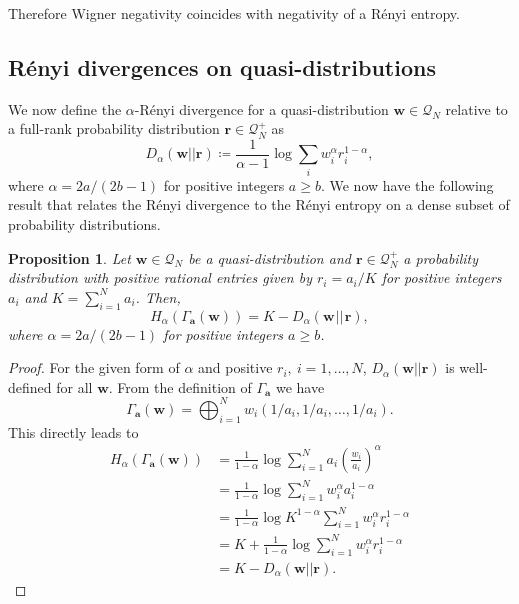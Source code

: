 \documentclass[
twocolumn,
superscriptaddress
]{revtex4-1}
\newtheorem{proposition}[theorem]{Proposition}
\def\bma{\boldsymbol{a}}
\def\r{\boldsymbol{r}}
\def\w{\boldsymbol{w}}
\begin{document}
Therefore Wigner negativity coincides with negativity of a R\'{e}nyi entropy.

\subsection*{R\'{e}nyi divergences on quasi-distributions}
We now define the $\alpha$-R\'{e}nyi divergence for a quasi-distribution $\w \in \mathcal{Q}_N$ relative to a full-rank probability distribution $\r\in \mathcal{Q}_N^+$ as
\begin{equation}
	D_\alpha(\w||\r) \coloneqq \frac{1}{\alpha - 1} \log \sum_{i} w_i^\alpha r_i^{1-\alpha},
\end{equation}
where $\alpha=2a/(2b-1)$ for positive integers $a \ge b$. We now have the following result that relates the R\'{e}nyi divergence to the R\'{e}nyi entropy on a dense subset of probability distributions.
\begin{proposition}\label{H2D}
	Let $\w\in \mathcal{Q}_N$ be a quasi-distribution and $\r \in \mathcal{Q}_N^+$ a probability distribution with positive rational entries given by $r_i = a_i/K$ for positive integers $a_i$ and $K = \sum_{i=1}^N a_i$.
	Then,
	\begin{equation}
		H_\alpha(\Gamma_{\bma}(\w)) = K - D_\alpha(\w \hspace{1pt}||\hspace{1pt} \r),
	\end{equation}
	where $\alpha = 2a / (2b-1)$ for positive integers $a \ge b$.
\end{proposition}
\begin{proof}
	For the given form of $\alpha$ and positive $r_i,\ i=1,\dots,N$, $D_\alpha(\w || \r)$ is well-defined for all $\w$. From the definition of $\Gamma_{\bma}$ we have
	\begin{equation}
		\Gamma_{\bma}(\w) = \bigoplus_{i=1}^N w_i (1/a_i, 1/a_i, \dots, 1/a_i).
	\end{equation}
	This directly leads to
	\begin{align}
		H_\alpha(\Gamma_{\bma}(\w)) &= \frac{1}{1-\alpha} \log \sum_{i=1}^N a_i \left( \frac{w_i}{a_i} \right)^\alpha \nonumber\\
		&= \frac{1}{1-\alpha} \log \sum_{i=1}^N w_i^{\alpha} a_i^{1-\alpha} \nonumber\\
		&= \frac{1}{1-\alpha} \log K^{1-\alpha} \sum_{i=1}^N w_i^{\alpha} r_i^{1-\alpha} \nonumber\\
		&= K + \frac{1}{1-\alpha} \log \sum_{i=1}^N w_i^{\alpha} r_i^{1-\alpha} \nonumber\\
		&= K - D_\alpha(\w ||\r).
	\end{align}
\end{proof}
\end{document}
